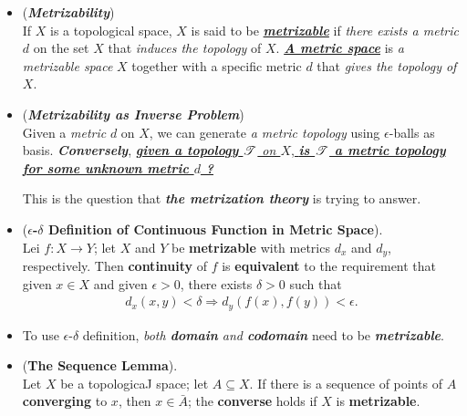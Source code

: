 \documentclass[11pt]{article}
\begin{document}
\begin{itemize}
\item \begin{definition} (\textbf{\emph{Metrizability}})\\
If $X$ is a topological space, $X$ is said to be \underline{\emph{\textbf{metrizable}}} if \emph{there exists a metric} $d$ on the set $X$ that \emph{induces the topology} of $X$. \underline{\emph{\textbf{A metric space}}} is \emph{a metrizable space} $X$ together with a specific metric $d$ that \emph{gives the topology of $X$}.
\end{definition}

\item \begin{remark} (\emph{\textbf{Metrizability as Inverse Problem}})\\
Given a \emph{metric} $d$ on $X$, we can generate \emph{a metric topology} using $\epsilon$-balls as basis. \emph{\textbf{Conversely}}, \underline{\emph{\textbf{given a topology} ${\mathscr T}$ on $X$}, \emph{\textbf{is ${\mathscr T}$ a metric topology for some unknown metric $d$ ?}}} 

This is the question that \emph{\textbf{the metrization theory}} is trying to answer.
\end{remark}


\item \begin{theorem} (\textbf{$\epsilon$-$\delta$ Definition of Continuous Function in Metric Space}). \citep{munkres2000topology} \\
Lei $f: X \rightarrow Y$; let $X$ and $Y$ be \textbf{metrizable} with metrics $d_x$ and $d_y$, respectively. Then \textbf{continuity} of $f$ is \textbf{equivalent} to the requirement that given $x \in X$ and given $\epsilon > 0$, there exists $\delta > 0$ such that
\begin{align*}
d_x(x, y) < \delta \Rightarrow d_{y}(f(x), f(y)) < \epsilon.
\end{align*}
\end{theorem}

\item \begin{remark}
To use $\epsilon$-$\delta$ definition, \emph{both \textbf{domain} and \textbf{codomain}} need to be \emph{\textbf{metrizable}}.
\end{remark}

\item \begin{lemma}(\textbf{The Sequence Lemma}). \citep{munkres2000topology}\\
Let $X$ be a topologicaJ space; let $A \subseteq X$. If there is a sequence of points of $A$ \textbf{converging} to $x$, then $x \in \bar{A}$; the \textbf{converse} holds if $X$ is \textbf{metrizable}.
\end{lemma}


\end{itemize}
\end{document}

